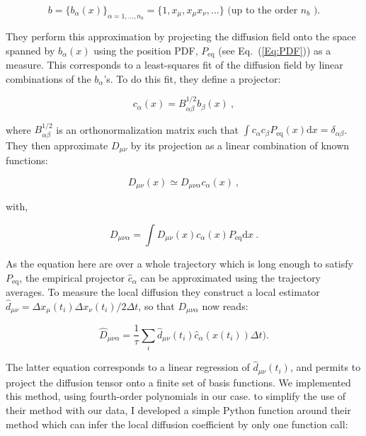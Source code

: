 \begin{equation}
	b = \{b_\alpha (x)\}_{\alpha= 1,...,n_b} = \{1, x_\mu, x_\mu x_\nu, ...\} \text{ (up to the order } n_b \text{ )}.
\end{equation} 

They perform this approximation by projecting the diffusion field onto the space spanned by $b_\alpha (x)$ using the position \gls{PDF}, $P_\mathrm{eq}$ (see Eq.~(\ref{Eq:PDF})) as a measure. This corresponds to a least-squares fit of the diffusion field by linear combinations of the $b_\alpha$'s. To do this fit, they define a projector:

\begin{equation}
	c_\alpha (x) = B^{1/2}_{\alpha \beta} b_\beta (x) ~,
\end{equation}

where $ B^{1/2}_{\alpha \beta}$ is an orthonormalization matrix such that $\int c_\alpha c_\beta P_\mathrm{eq}(x)\mathrm{d}x = \delta _{\alpha \beta}$. They then approximate $D_{\mu \nu}$ by its projection as a linear combination of known functions:

\begin{equation}
	D_{\mu \nu} (x) \simeq D_{\mu \nu \alpha} c_\alpha (x) ~,
\end{equation}  

with,

\begin{equation}
	D_{\mu \nu \alpha} = \int D_{\mu \nu}(x) c_\alpha (x) P_\mathrm{eq} \mathrm{d}x ~.
\end{equation}

As the equation here are over a whole trajectory which is long enough to satisfy $P_\mathrm{eq}$, the empirical projector $\hat{c}_\alpha$ can be approximated using the trajectory averages. To measure the local diffusion they construct a local estimator $\hat{d}_{\mu \nu} = \Delta x_\mu (t_i) \Delta x_\nu (t_i) / 2\Delta t$, so that $D_{\mu \nu \alpha}$ now reads:

\begin{equation}
	\hat{D}_{\mu \nu \alpha} = \frac{1}{\tau} \sum _i \hat{d}_{\mu \nu} (t_i) \hat{c}_\alpha (x (t_i)) \Delta t).
\end{equation}

The latter equation corresponds to a linear regression of $\hat{d}_{\mu \nu} (t_i)$, and permits to project the diffusion tensor onto a finite set of basis functions. We implemented this method, using fourth-order polynomials in our case. to simplify the use of their method with our data, I developed a simple Python function around their method \href{https://github.com/eXpensia/StochasticForceInference/blob/master/fun_SFI.py}{\faGithub} which can infer the local diffusion coefficient by only one function call: 

